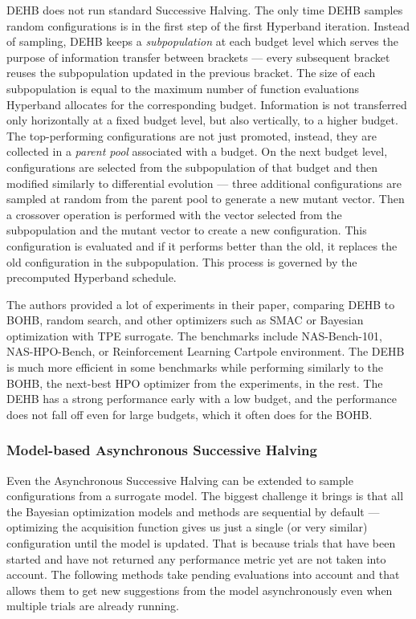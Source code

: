DEHB does not run standard Successive Halving. The only time DEHB samples random configurations is in the first step of the first Hyperband iteration. Instead of sampling, DEHB keeps a \textit{subpopulation} at each budget level which serves the purpose of information transfer between brackets --- every subsequent bracket reuses the subpopulation updated in the previous bracket. The size of each subpopulation is equal to the maximum number of function evaluations Hyperband allocates for the corresponding budget. Information is not transferred only horizontally at a fixed budget level, but also vertically, to a higher budget. The top-performing configurations are not just promoted, instead, they are collected in a \textit{parent pool} associated with a budget. On the next budget level, configurations are selected from the subpopulation of that budget and then modified similarly to differential evolution --- three additional configurations are sampled at random from the parent pool to generate a new mutant vector. Then a crossover operation is performed with the vector selected from the subpopulation and the mutant vector to create a new configuration. This configuration is evaluated and if it performs better than the old, it replaces the old configuration in the subpopulation. This process is governed by the precomputed Hyperband schedule.

The authors provided a lot of experiments in their paper, comparing DEHB to BOHB, random search, and other optimizers such as SMAC or Bayesian optimization with TPE surrogate. The benchmarks include NAS-Bench-101, NAS-HPO-Bench, or Reinforcement Learning Cartpole environment. The DEHB is much more efficient in some benchmarks while performing similarly to the BOHB, the next-best HPO optimizer from the experiments, in the rest. The DEHB has a strong performance early with a low budget, and the performance does not fall off even for large budgets, which it often does for the BOHB.

\subsubsection{Model-based Asynchronous Successive Halving}
Even the Asynchronous Successive Halving can be extended to sample configurations from a surrogate model. The biggest challenge it brings is that all the Bayesian optimization models and methods are sequential by default --- optimizing the acquisition function gives us just a single (or very similar) configuration until the model is updated. That is because trials that have been started and have not returned any performance metric yet are not taken into account. The following methods take pending evaluations into account and that allows them to get new suggestions from the model asynchronously even when multiple trials are already running.

